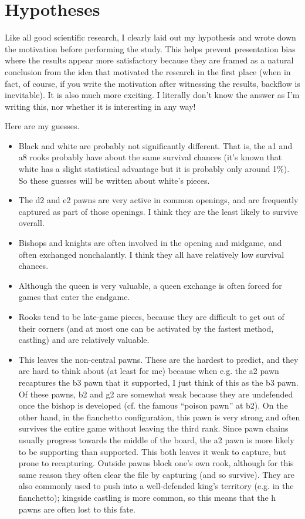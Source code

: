 \documentclass[twocolumn]{article}
\begin{document}
\section{Hypotheses}

Like all good scientific research, I clearly laid out my hypothesis
and wrote down the motivation before performing the study. This helps
prevent presentation bias where the results appear more satisfactory
because they are framed as a natural conclusion from the idea that
motivated the research in the first place (when in fact, of course, if
you write the motivation after witnessing the results, backflow is
inevitable). It is also much more exciting. I literally don't know the
answer as I'm writing this, nor whether it is interesting in any way!


Here are my guesses.

\begin{itemize}
\item Black and white are probably not significantly different. That
  is, the a1 and a8 rooks probably have about the same survival
  chances (it's known that white has a slight statistical advantage
  but it is probably only around 1\%). So these guesses will be
  written about white's pieces.
\item The d2 and e2 pawns are very active in common openings, and
  are frequently captured as part of those openings. I think they
  are the least likely to survive overall.
\item Bishops and knights are often involved in the opening and
  midgame, and often exchanged nonchalantly. I think they all have
  relatively low survival chances.
\item Although the queen is very valuable, a queen exchange is often
  forced for games that enter the endgame.
\item Rooks tend to be late-game pieces, because they are difficult
  to get out of their corners (and at most one can be activated
  by the fastest method, castling) and are relatively valuable.
\item This leaves the non-central pawns. These are the hardest to
  predict, and they are hard to think about (at least for me) because
  when e.g. the a2 pawn recaptures the b3 pawn that it supported, I
  just think of this as the b3 pawn. Of these pawns, b2 and g2 are
  somewhat weak because they are undefended once the bishop is
  developed (cf. the famous ``poison pawn'' at b2). On the other hand,
  in the fianchetto configuration, this pawn is very strong and often
  survives the entire game without leaving the third rank. Since pawn
  chains usually progress towards the middle of the board, the a2 pawn
  is more likely to be supporting than supported. This both leaves it
  weak to capture, but prone to recapturing. Outside pawns block one's
  own rook, although for this same reason they often clear the file by
  capturing (and so survive). They are also commonly used to push into
  a well-defended king's territory (e.g. in the fianchetto); kingside
  castling is more common, so this means that the h pawns are often
  lost to this fate.
\end{itemize}
\end{document}
